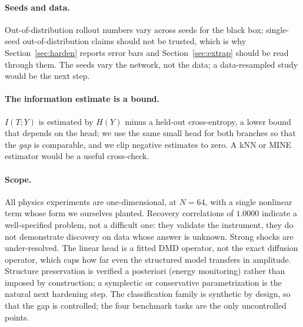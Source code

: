 \documentclass[11pt,a4paper]{article}
\begin{document}
\paragraph{Seeds and data.} Out-of-distribution rollout numbers vary across seeds for the black box; single-seed out-of-distribution claims should not be trusted, which is why Section~\ref{sec:harden} reports error bars and Section~\ref{sec:extrap} should be read through them. The seeds vary the network, not the data; a data-resampled study would be the next step.

\paragraph{The information estimate is a bound.} $I(T;Y)$ is estimated by $H(Y)$ minus a held-out cross-entropy, a lower bound that depends on the head; we use the same small head for both branches so that the \emph{gap} is comparable, and we clip negative estimates to zero. A kNN or MINE estimator would be a useful cross-check.

\paragraph{Scope.} All physics experiments are one-dimensional, at $N=64$, with a single nonlinear term whose form we ourselves planted. Recovery correlations of $1.0000$ indicate a well-specified problem, not a difficult one: they validate the instrument, they do not demonstrate discovery on data whose answer is unknown. Strong shocks are under-resolved. The linear head is a fitted DMD operator, not the exact diffusion operator, which caps how far even the structured model transfers in amplitude. Structure preservation is verified a posteriori (energy monitoring) rather than imposed by construction; a symplectic or conservative parametrization is the natural next hardening step. The classification family is synthetic by design, so that the gap is controlled; the four benchmark tasks are the only uncontrolled points.
\end{document}
